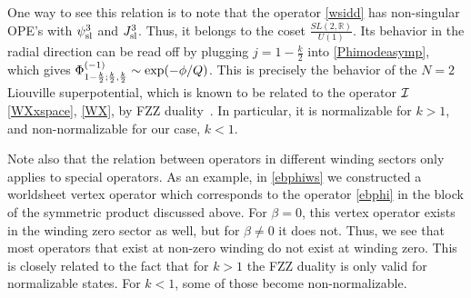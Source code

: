 \documentclass[12pt]{article}
\def\sltwo{\ensuremath{SL(2,\bR)}}
\newcommand{\bR}{{\mathbb R}}
\numberwithin{equation}{section}
\def\exp{{\rm exp}}
\begin{document}
One way to see this relation is to note that the operator \eqref{wsidd} has non-singular OPE's with $\psi^3_{\rm sl}$ and $J^3_{\rm sl}$. Thus, it belongs to the coset $\frac{\sltwo}{U(1)}$. Its behavior in the radial direction can be read off by plugging $j=1-\frac k2$ into \eqref{Phimodeasymp}, which gives $\Phi_{1-\frac{k}{2};\frac{k}{2},\frac{k}{2}}^{(-1)}\sim \exp(-\phi/Q)$. This is precisely the behavior of the $N=2$ Liouville superpotential, which is known to be related to the operator $\mathcal {I}$ \eqref{WXxspace}, \eqref{WX}, by FZZ duality~. In particular, it is normalizable for $k>1$, and non-normalizable for our case, $k<1$.

Note also that the relation between operators in different winding sectors only applies to special operators. As an example, in \eqref{ebphiws} we constructed a worldsheet vertex operator which corresponds to the operator \eqref{ebphi} in the block of the symmetric product discussed above. For $\beta=0$, this vertex operator exists in the winding zero sector as well, but for $\beta\not=0$ it does not. Thus, we see that most operators that exist at non-zero winding do not exist at winding zero. This is closely related to the fact that for $k>1$ the FZZ duality is only valid for normalizable states. For $k<1$, some of those become non-normalizable.
\end{document}
